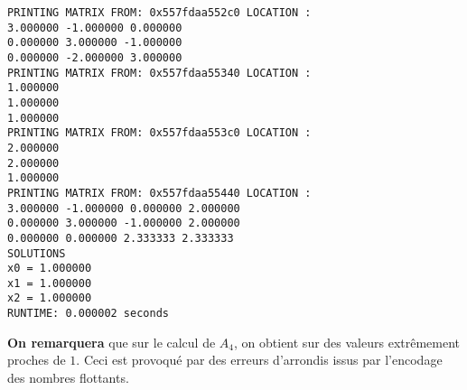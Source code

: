 \begin{lstlisting}[caption=Matrix 6 results, basicstyle=\fontsize{8}{10}\selectfont]
PRINTING MATRIX FROM: 0x557fdaa552c0 LOCATION :
3.000000 -1.000000 0.000000
0.000000 3.000000 -1.000000
0.000000 -2.000000 3.000000
PRINTING MATRIX FROM: 0x557fdaa55340 LOCATION :
1.000000
1.000000
1.000000
PRINTING MATRIX FROM: 0x557fdaa553c0 LOCATION :
2.000000
2.000000
1.000000
PRINTING MATRIX FROM: 0x557fdaa55440 LOCATION :
3.000000 -1.000000 0.000000 2.000000
0.000000 3.000000 -1.000000 2.000000
0.000000 0.000000 2.333333 2.333333
SOLUTIONS
x0 = 1.000000
x1 = 1.000000
x2 = 1.000000
RUNTIME: 0.000002 seconds                       
\end{lstlisting}
\textbf{On remarquera} que sur le calcul de $A_4$, on obtient sur des valeurs extrêmement proches de $1$. Ceci est provoqué par des erreurs d'arrondis issus par l'encodage des nombres flottants.  